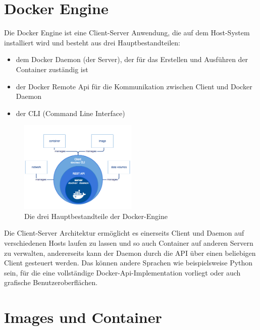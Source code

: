
\section{Docker Engine}

Die Docker Engine ist eine Client-Server Anwendung, die auf dem Host-System installiert wird und besteht aus drei Hauptbestandteilen:\\

\begin{itemize}
  \item dem Docker Daemon (der Server), der für das Erstellen und Ausführen der Container zuständig ist
  \item der Docker Remote Api für die Kommunikation zwischen Client und Docker Daemon
  \item der CLI (Command Line Interface)
\end{itemize}

\begin{figure}[!ht]
  \centering
  \includegraphics[width=0.5\textwidth]{images/8-docker-engine.png}
  \caption{Die drei Hauptbestandteile der Docker-Engine \cite{docker:ud}}
\end{figure}

Die Client-Server Architektur ermöglicht es einerseits Client und Daemon auf verschiedenen Hosts laufen zu lassen und so auch Container auf anderen Servern zu verwalten, andererseits kann der Daemon durch die API über einen beliebigen Client gesteuert werden. Das können andere Sprachen wie beispielsweise Python sein, für die eine vollständige Docker-Api-Implementation vorliegt oder auch grafische Benutzeroberflächen.


\section{Images und Container}

